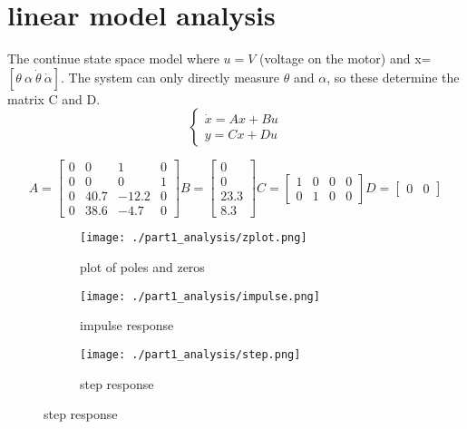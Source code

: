 \section{linear model analysis}

The continue state space model where $u=V$ (voltage on the motor) and x=$[\theta \ \alpha \  \dot{\theta} \ \dot{\alpha} ]$. The system can only directly measure $\theta$ and $\alpha$, so these determine the matrix C and D.
$$
\begin{cases}
\dot{x}=Ax+Bu \\
y=Cx+Du
\end{cases}
$$

$$
A=
\begin{bmatrix}
0 & 0 & 1 & 0 \\
0 & 0 & 0 & 1 \\
0 & 40.7 & -12.2 & 0 \\
0 & 38.6 & -4.7 & 0 
\end{bmatrix}
B=
\begin{bmatrix}
0 \\
0 \\
23.3 \\
8.3
\end{bmatrix}
C=
\begin{bmatrix}
1 & 0 & 0 & 0\\
0 & 1 & 0 & 0
\end{bmatrix}
D=
\begin{bmatrix}
0 & 0
\end{bmatrix}
$$

\begin{figure}[H]
	\centering
	\begin{subfigure}[b]{0.45\textwidth}
		\texttt{[image: ./part1\_analysis/zplot.png]}
		\caption{plot of poles and zeros}
	\end{subfigure}
	\begin{subfigure}[b]{0.45\textwidth}
		\texttt{[image: ./part1\_analysis/impulse.png]}
		\caption{impulse response}
	\end{subfigure}
	\begin{subfigure}[b]{0.45\textwidth}
		\texttt{[image: ./part1\_analysis/step.png]}
		\caption{step response}
	\end{subfigure}
\end{figure}